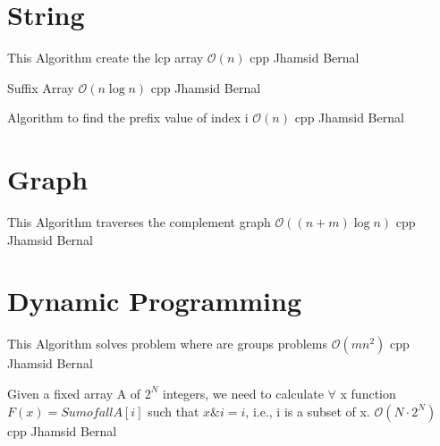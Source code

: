 \section{String}

{This Algorithm create the lcp array}
{$\mathcal{O}(n)$}
{cpp}{}
{Jhamsid Bernal}

{Suffix Array}
{$\mathcal{O}(n \log{n})$}
{cpp}{}
{Jhamsid Bernal}
\progress

{Algorithm to find the prefix value of index i}
{$\mathcal{O}(n)$}
{cpp}{}
{Jhamsid Bernal}
\progress

\section{Graph}

{This Algorithm traverses the complement graph}
{$\mathcal{O}((n + m)\log{n})$}
{cpp}{}
{Jhamsid Bernal}
\progress

\section{Dynamic Programming}

{This Algorithm solves problem where are groups problems}
{$\mathcal{O}(mn^2)$}
{cpp}{}
{Jhamsid Bernal}
\progress

{Given a fixed array A of $2^N$ integers, we need to calculate $\forall$
x function $F(x) = Sum of all A[i]$ such that $x\&i = i$, i.e., i is a subset 
of x.}
{$\mathcal{O}(N \cdot 2^N)$}
{cpp}{}
{Jhamsid Bernal}

